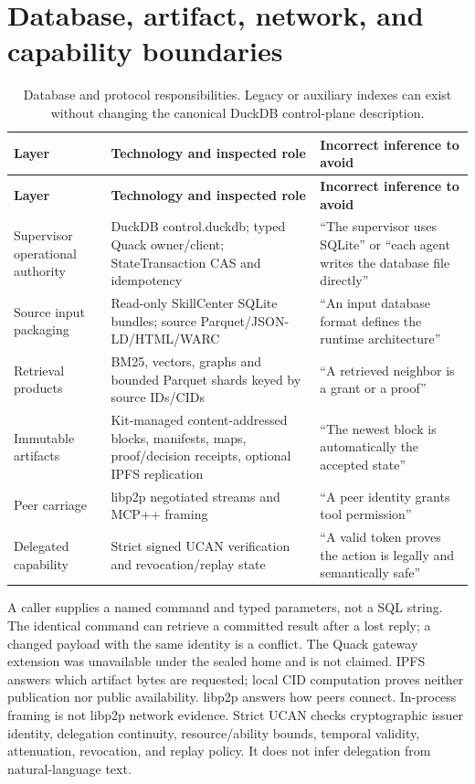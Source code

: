 \documentclass{article}
\begin{document}
\section{Database, artifact, network, and capability boundaries}
\begingroup
\renewcommand{\thetable}{C1}
\begin{longtable}{@{}>{\raggedright\arraybackslash}p{.24\linewidth} >{\raggedright\arraybackslash}p{.32\linewidth} >{\raggedright\arraybackslash}p{.38\linewidth}@{}}
\caption{Database and protocol responsibilities. Legacy or auxiliary indexes can exist without changing the canonical DuckDB control-plane description.}\label{tab:C1}\\
\toprule
\textbf{Layer} & \textbf{Technology and inspected role} & \textbf{Incorrect inference to avoid} \\
\midrule
\endfirsthead
\textbf{Layer} & \textbf{Technology and inspected role} & \textbf{Incorrect inference to avoid} \\
\midrule
\endhead
\bottomrule
\endlastfoot
Supervisor operational authority & DuckDB control.duckdb; typed Quack owner/client; StateTransaction CAS and idempotency & ``The supervisor uses SQLite'' or ``each agent writes the database file directly'' \\[3pt]
Source input packaging & Read-only SkillCenter SQLite bundles; source Parquet/JSON-LD/HTML/WARC & ``An input database format defines the runtime architecture'' \\[3pt]
Retrieval products & BM25, vectors, graphs and bounded Parquet shards keyed by source IDs/CIDs & ``A retrieved neighbor is a grant or a proof'' \\[3pt]
Immutable artifacts & Kit-managed content-addressed blocks, manifests, maps, proof/decision receipts, optional IPFS replication & ``The newest block is automatically the accepted state'' \\[3pt]
Peer carriage & libp2p negotiated streams and MCP++ framing & ``A peer identity grants tool permission'' \\[3pt]
Delegated capability & Strict signed UCAN verification and revocation/replay state & ``A valid token proves the action is legally and semantically safe'' \\[3pt]
\end{longtable}
\endgroup

A caller supplies a named command and typed parameters, not a SQL string. The identical command can retrieve a committed result after a lost reply; a changed payload with the same identity is a conflict. The Quack gateway extension was unavailable under the sealed home and is not claimed. IPFS answers which artifact bytes are requested; local CID computation proves neither publication nor public availability. libp2p answers how peers connect. In-process framing is not libp2p network evidence. Strict UCAN checks cryptographic issuer identity, delegation continuity, resource/ability bounds, temporal validity, attenuation, revocation, and replay policy. It does not infer delegation from natural-language text.
\end{document}
